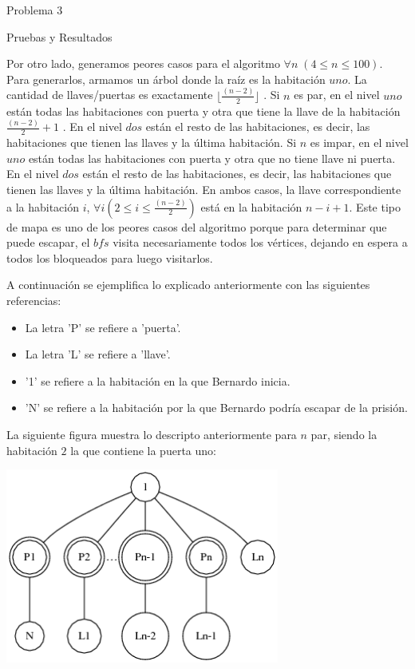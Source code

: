 \begin{section}{Problema 3}
\begin{subsection}{Pruebas y Resultados}
		\newpage

		Por otro lado, generamos peores casos para el algoritmo $\forall n\; (4 \leq n \leq 100)$. Para generarlos, armamos un árbol donde la raíz es la habitación  $uno$. La cantidad de llaves/puertas es exactamente $\lfloor \frac{(n-2)}{2}\rfloor$ . Si $n$ es par, en el nivel $uno$  están todas las habitaciones con puerta y otra que tiene la llave de la habitación $\frac{(n-2)}{2} + 1$ . En el nivel $dos$ están el resto de las habitaciones, es decir, las habitaciones que tienen las llaves y la última habitación. Si $n$ es impar, en el nivel $uno$  están todas las habitaciones con puerta y otra que no tiene llave ni puerta. En el nivel $dos$ están el resto de las habitaciones, es decir, las habitaciones que tienen las llaves y la última habitación. En ambos casos, la llave correspondiente a la habitación $i$, $\forall i (2 \leq i \leq \frac{(n-2)}{2})$ está en la habitación $n-i+1$. Este tipo de mapa es uno de los peores casos del algoritmo porque para determinar que puede escapar, el $bfs$ visita necesariamente todos los vértices, dejando en espera a todos los bloqueados para luego visitarlos.\Pa

		A continuación se ejemplifica lo explicado anteriormente con las siguientes referencias:

		\begin{itemize}
		\item La letra 'P' se refiere a 'puerta'.
		\item La letra 'L' se refiere a 'llave'.
		\item '1' se refiere a la habitación en la que Bernardo inicia.
		\item 'N' se refiere a la habitación por la que Bernardo podría escapar de la prisión.
		\end{itemize}

		\newpage

		La siguiente figura muestra lo descripto anteriormente para $n$ par, siendo la habitación $2$ la que contiene la puerta uno:\VSP
	
		\begin{center}\includegraphics[width=9cm]{prision/peor_caso.png}\end{center}
		

\end{subsection}
\end{section}
